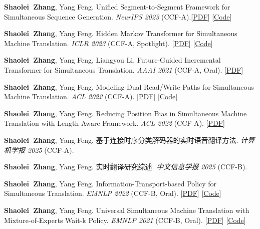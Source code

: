 \documentclass{resume}
\begin{document}
\begin{enumerate}[label={[\arabic*]},parsep=0ex]
    \item \textbf{Shaolei\ Zhang}, Yang Feng. Unified Segment-to-Segment Framework for Simultaneous Sequence Generation. \textit{NeurIPS 2023} (\textcolor{red2}{CCF-A}).[\href{https://openreview.net/pdf?id=GuErIOGLie}{PDF}] [\href{https://github.com/ictnlp/Seg2Seg}{Code}]
    
    \item \textbf{Shaolei\ Zhang}, Yang Feng. Hidden Markov Transformer for Simultaneous Machine Translation. \textit{ICLR 2023} (\textcolor{red2}{CCF-A, Spotlight}). [\href{https://openreview.net/forum?id=9y0HFvaAYD6}{PDF}] [\href{https://github.com/ictnlp/HMT}{Code}]

    \item \textbf{Shaolei\ Zhang}, Yang Feng, Liangyou Li. Future-Guided Incremental Transformer for Simultaneous Translation. \textit{AAAI 2021} (\textcolor{red2}{CCF-A, Oral}). [\href{https://arxiv.org/pdf/2012.12465.pdf}{PDF}]
    
    \item \textbf{Shaolei\ Zhang}, Yang Feng. Modeling Dual Read/Write Paths for Simultaneous Machine Translation. \textit{ACL 2022} (\textcolor{red2}{CCF-A}). [\href{https://aclanthology.org/2022.acl-long.176.pdf}{PDF}] [\href{https://github.com/ictnlp/Dual-Path}{Code}]
    
    \item \textbf{Shaolei\ Zhang}, Yang Feng. Reducing Position Bias in Simultaneous Machine Translation with Length-Aware Framework. \textit{ACL 2022} (\textcolor{red2}{CCF-A}). [\href{https://aclanthology.org/2022.acl-long.467.pdf}{PDF}]

    \item \textbf{Shaolei\ Zhang}, Yang Feng. 基于连接时序分类解码器的实时语音翻译方法. \textit{计算机学报 2025} (\textcolor{red2}{CCF-A}).

    \item \textbf{Shaolei\ Zhang}, Yang Feng. 实时翻译研究综述. \textit{中文信息学报 2025} (\textcolor{red2}{CCF-B}).
    

    
    \item \textbf{Shaolei\ Zhang}, Yang Feng. Information-Transport-based Policy for Simultaneous Translation. \textit{EMNLP 2022} (\textcolor{red2}{CCF-B, Oral}). [\href{https://arxiv.org/pdf/2210.12357.pdf}{PDF}] [\href{https://github.com/ictnlp/ITST}{Code}]

    \item \textbf{Shaolei\ Zhang}, Yang Feng. Universal Simultaneous Machine Translation with Mixture-of-Experts Wait-k Policy. \textit{EMNLP 2021} (\textcolor{red2}{CCF-B, Oral}). [\href{https://aclanthology.org/2021.emnlp-main.581.pdf}{PDF}] [\href{https://github.com/ictnlp/MoE-Waitk}{Code}]


\end{enumerate}
\end{document}
